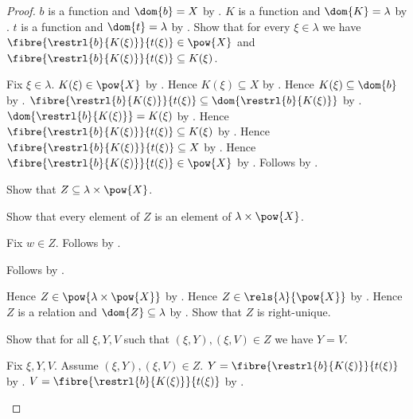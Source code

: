 \begin{proof}
    $b$ is a function and $\dom{b}=X$ by
        .
    $K$ is a function and $\dom{K}=\lambda$ by
        .
    $t$ is a function and $\dom{t}=\lambda$ by
        .
    Show that for every $\xi\in\lambda$ we have
        $\fibre{\restrl{b}{K(\xi)}}{t(\xi)}\in\pow{X}$ and
        $\fibre{\restrl{b}{K(\xi)}}{t(\xi)}\subseteq K(\xi)$.
    \begin{subproof}
        Fix $\xi\in\lambda$.
        $K(\xi)\in\pow{X}$ by .
        Hence $K(\xi)\subseteq X$ by .
        Hence $K(\xi)\subseteq\dom{b}$ by \auto.
        $\fibre{\restrl{b}{K(\xi)}}{t(\xi)}
            \subseteq\dom{\restrl{b}{K(\xi)}}$ by
            .
        $\dom{\restrl{b}{K(\xi)}}=K(\xi)$ by
            .
        Hence $\fibre{\restrl{b}{K(\xi)}}{t(\xi)}\subseteq K(\xi)$ by
            \auto.
        Hence $\fibre{\restrl{b}{K(\xi)}}{t(\xi)}\subseteq X$ by
            .
        Hence $\fibre{\restrl{b}{K(\xi)}}{t(\xi)}\in\pow{X}$ by
            .
        Follows by \auto.
    \end{subproof}
    Show that $Z\subseteq\lambda\times\pow{X}$.
    \begin{subproof}
        Show that every element of $Z$ is an element of
            $\lambda\times\pow{X}$.
        \begin{subproof}
            Fix $w\in Z$.
            Follows by .
        \end{subproof}
        Follows by .
    \end{subproof}
    Hence $Z\in\pow{\lambda\times\pow{X}}$ by .
    Hence $Z\in\rels{\lambda}{\pow{X}}$ by .
    Hence $Z$ is a relation and $\dom{Z}\subseteq\lambda$ by
        .
    Show that $Z$ is right-unique.
    \begin{subproof}
        Show that for all $\xi,Y,V$ such that $(\xi,Y),(\xi,V)\in Z$
            we have $Y=V$.
        \begin{subproof}
            Fix $\xi,Y,V$.
            Assume $(\xi,Y),(\xi,V)\in Z$.
            $Y=\fibre{\restrl{b}{K(\xi)}}{t(\xi)}$ by
                .
            $V=\fibre{\restrl{b}{K(\xi)}}{t(\xi)}$ by
                .

\end{subproof}
\end{subproof}
\end{proof}
